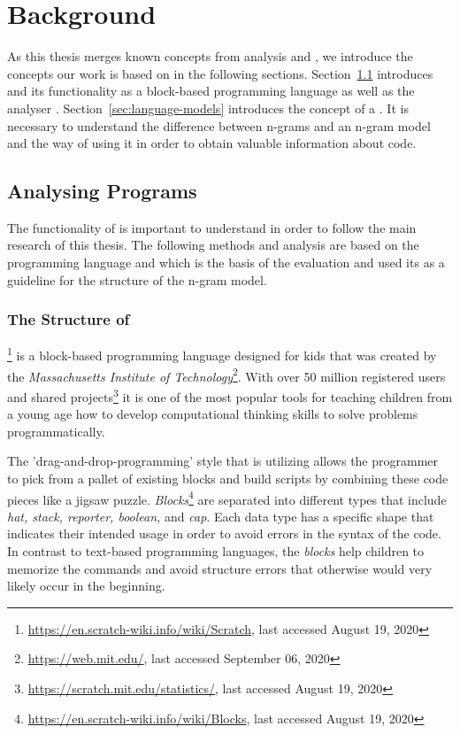 \chapter{Background}\label{chap:background}

As this thesis merges known concepts from \scratch{} analysis and \ngram{}, we introduce the concepts our work is based on in the following sections. Section~\ref{sec:analysing-scratch} introduces \scratch{} and its functionality as a block-based programming language as well as the \scratch{} analyser \litterbox{}. Section~\ref{sec:language-models} introduces the concept of a \ngram{}. It is necessary to understand the difference between n-grams and an n-gram model and the way of using it in order to obtain valuable information about \scratch{} code.


\section{Analysing \scratch{} Programs}\label{sec:analysing-scratch}
The functionality of \scratch{} is important to understand in order to follow the main research of this thesis. The following methods and analysis are based on the programming language \scratch{} and \litterbox{} which is the basis of the evaluation and used its \AST{} as a guideline for the structure of the n-gram model. 

\subsection{The Structure of \scratch{}}\label{subsec:scratch}
\scratch{}\footnote{\url{https://en.scratch-wiki.info/wiki/Scratch}, last accessed August 19, 2020} is a block-based programming language designed for kids that was created by the \textit{Massachusetts Institute of Technology}\footnote{\url{https://web.mit.edu/}, last accessed September 06, 2020}. With over 50 million registered users and shared projects\footnote{\url{https://scratch.mit.edu/statistics/}, last accessed August 19, 2020} it is one of the most popular tools for teaching children from a young age how to develop computational thinking skills to solve problems programmatically.

The 'drag-and-drop-programming' style that \scratch{} is utilizing allows the programmer to pick from a pallet of existing blocks and build scripts by combining these code pieces like a jigsaw puzzle.
\textit{Blocks}\footnote{\url{https://en.scratch-wiki.info/wiki/Blocks}, last accessed August 19, 2020} are separated into different types that include \textit{hat, stack, reporter, boolean,} and \textit{cap}. Each data type has a specific shape that indicates their intended usage in order to avoid errors in the syntax of the code. In contrast to text-based programming languages, the \textit{blocks} help children to memorize the commands and avoid structure errors that otherwise would very likely occur in the beginning. 


